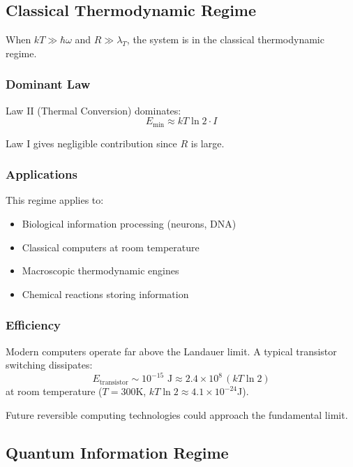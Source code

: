 \documentclass[11pt,a4paper]{article}
\theoremstyle{plain}
\theoremstyle{definition}
\theoremstyle{remark}
\begin{document}
\subsection{Classical Thermodynamic Regime}

When $kT \gg \hbar\omega$ and $R \gg \lambda_T$, the system is in the classical thermodynamic regime.

\subsubsection{Dominant Law}

Law II (Thermal Conversion) dominates:
\begin{equation}
E_{\text{min}} \approx kT\ln 2\cdot I
\end{equation}

Law I gives negligible contribution since $R$ is large.

\subsubsection{Applications}

This regime applies to:
\begin{itemize}[leftmargin=*]
\item Biological information processing (neurons, DNA)
\item Classical computers at room temperature
\item Macroscopic thermodynamic engines
\item Chemical reactions storing information
\end{itemize}

\subsubsection{Efficiency}

Modern computers operate far above the Landauer limit. A typical transistor switching dissipates:
\begin{equation}
E_{\text{transistor}} \sim 10^{-15}\text{ J} \approx 2.4\times 10^8\,(kT\ln 2)
\end{equation}
at room temperature ($T=300$K, $kT\ln 2 \approx 4.1\times 10^{-24}$J).

Future reversible computing technologies could approach the fundamental limit.

\subsection{Quantum Information Regime}
\end{document}

